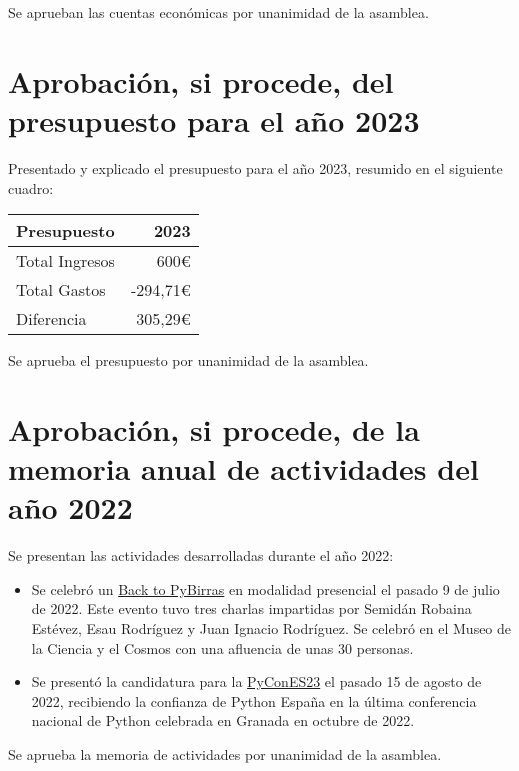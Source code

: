 \documentclass[a4paper,12pt]{article}
\begin{document}
Se aprueban las cuentas económicas por unanimidad de la asamblea.

\section{Aprobación, si procede, del presupuesto para el año 2023}

Presentado y explicado el presupuesto para el año 2023, resumido
en el siguiente cuadro:

\begin{center}
    \begin{tabular}{ | l | r | }
        \hline
        \textbf{Presupuesto} & \textbf{2023} \\ 
        \hline
        Total Ingresos & 600\euro \\  
        \hline
        Total Gastos & -294,71\euro \\  
        \hline
        \hline
        Diferencia & 305,29\euro \\  
        \hline
    \end{tabular}
\end{center}

Se aprueba el presupuesto por unanimidad de la asamblea.

\section{Aprobación, si procede, de la memoria anual de actividades del año 2022}

Se presentan las actividades desarrolladas durante el año 2022:

\begin{itemize}
    \item Se celebró un \href{https://medium.com/pythoncanarias/regreso-al-pybirras-6cb3513f0469}{Back to PyBirras} en modalidad presencial el pasado 9 de julio de 2022. Este evento tuvo tres charlas impartidas por Semidán Robaina Estévez, Esau Rodríguez y Juan Ignacio Rodríguez. Se celebró en el Museo de la Ciencia y el Cosmos con una afluencia de unas 30 personas.
    \item Se presentó la candidatura para la \href{https://2023.es.pycon.org}{PyConES23} el pasado 15 de agosto de 2022, recibiendo la confianza de Python España en la última conferencia nacional de Python celebrada en Granada en octubre de 2022.
\end{itemize}

Se aprueba la memoria de actividades por unanimidad de la asamblea.
\end{document}
